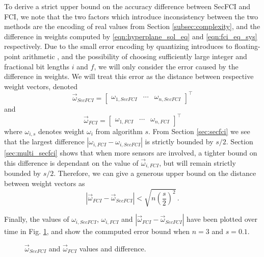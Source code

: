 \documentclass[letterpaper, 10 pt, conference]{ieeeconf}  %
\begin{document}
To derive a strict upper bound on the accuracy difference between SecFCI and FCI, we note that the two factors which introduce inconsistency between the two methods are the encoding of real values from Section \ref{subsec:complexity}, and the difference in weights computed by \eqref{eqn:hyperplane_sol_eq} and \eqref{eqn:fci_eq_sys} respectively. Due to the small error encoding by quantizing introduces to floating-point arithmetic \cite{aristovEncryptedMultisensorInformation2018}, and the possibility of choosing sufficiently large integer and fractional bit lengths $i$ and $f$, we will only consider the error caused by the difference in weights. We will treat this error as the distance between respective weight vectors, denoted
\begin{equation}
   \vec{\omega}_{SecFCI} = 
   \begin{bmatrix}
      \omega_{1,SecFCI} & \cdots & \omega_{n,SecFCI}
   \end{bmatrix}^\top
\end{equation}
and
\begin{equation}
   \vec{\omega}_{FCI} = 
   \begin{bmatrix}
      \omega_{1,FCI} & \cdots & \omega_{n,FCI}
   \end{bmatrix}^\top
\end{equation}
where $\omega_{i,s}$ denotes weight $\omega_i$ from algorithm $s$. From Section \ref{sec:secfci} we see that the largest difference $|\omega_{i,FCI} - \omega_{i,SecFCI}|$ is strictly bounded by $s/2$. Section \ref{sec:multi_secfci} shows that when more sensors are involved, a tighter bound on this difference is dependant on the value of $\vec{\omega}_{i,FCI}$, but will remain strictly bounded by $s/2$. Therefore, we can give a generous upper bound on the distance between weight vectors as
\begin{equation}
   |\vec{\omega}_{FCI} - \vec{\omega}_{SecFCI}| < \sqrt{n\left(\frac{s}{2}\right)^2}\,. \label{eqn:accuracy_error_bound}
\end{equation}

Finally, the values of $\omega_{i,SecFCI}$, $\omega_{i,FCI}$ and $|\vec{\omega}_{FCI} - \vec{\omega}_{SecFCI}|$ have been plotted over time in Fig. \ref{fig:fci_secfci_omegas}, and show the commputed error bound when $n=3$ and $s=0.1$.
\begin{figure}[tb]
   \vspace{-5pt}
   \begin{center}
      
   \end{center}
   \vspace{-10pt}
   \caption{$\vec{\omega}_{SecFCI}$ and $\vec{\omega}_{FCI}$ values and difference.}
   \vspace{-\baselineskip}
   \label{fig:fci_secfci_omegas}
\end{figure}
\end{document}
